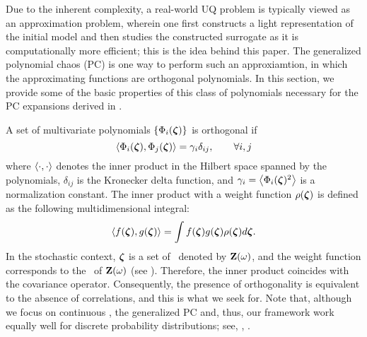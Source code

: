 
Due to the inherent complexity, a real-world UQ problem is typically viewed as an approximation problem, wherein one first constructs a light representation of the initial model and then studies the constructed surrogate as it is computationally more efficient; this is the idea behind this paper. The generalized polynomial chaos (PC) \cite{xiu2002} is one way to perform such an approxiamtion, in which the approximating functions are orthogonal polynomials. In this section, we provide some of the basic properties \cite{xiu2010, maitre2010} of this class of polynomials necessary for the PC expansions derived in .

A set of multivariate polynomials $\{ \Phi_i(\boldsymbol{\zeta}) \}$ is orthogonal if
\begin{equation} \elabel{orthogonality}
  \oInner{\pcb_i(\vz)}{\pcb_j(\vz)} = \pcn_i \delta_{ij}, \qquad \forall i, j
\end{equation}
where $\oInner{\idot}{\idot}$ denotes the inner product in the Hilbert space spanned by the polynomials, $\delta_{ij}$ is the Kronecker delta function, and $\pcn_i = \oInner{\pcb_i(\vz)^2}$ is a normalization constant. The inner product with a weight function $\rho(\boldsymbol{\zeta})$ is defined as the following multidimensional integral:
\begin{equation} \elabel{inner-product}
  \oInner{f(\vz)}{g(\vz)} = \int f(\vz) g(\vz) \PDF(\vz) d\vz.
\end{equation}
In the stochastic context, $\boldsymbol{\zeta}$ is a set of \rvs\ denoted by $\mathbf{Z}(\omega)$, and the weight function corresponds to the \pdf\ of $\mathbf{Z}(\omega)$ (see ). Therefore, the inner product coincides with the covariance operator. Consequently, the presence of orthogonality is equivalent to the absence of correlations, and this is what we seek for. Note that, although we focus on continuous \rvs, the generalized PC and, thus, our framework work equally well for discrete probability distributions; see, \eg, \cite{xiu2010, maitre2010, xiu2002}.


